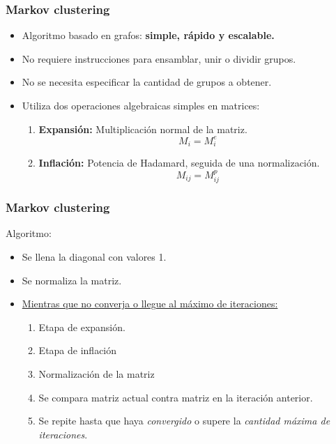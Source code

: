 \begin{frame}[t,fragile]
\frametitle {Markov clustering}
\begin{itemize}
\item Algoritmo basado en grafos: \textbf{simple, rápido y escalable.}
\vspace{2mm}
\item No requiere instrucciones para ensamblar, unir o dividir grupos.
\vspace{2mm}
\item No se necesita especificar la cantidad de grupos a obtener.
\vspace{2mm}
\item Utiliza dos operaciones algebraicas simples en matrices:
\vspace{2mm}
\begin{enumerate}
	\item \textbf{Expansión:} Multiplicación normal de la matriz. $$M_i = M_i ^ e$$
	\item \textbf{Inflación:} Potencia de Hadamard, seguida de una normalización. $$M_{ij} = M_{ij}^p$$
\end{enumerate}
\end{itemize}
\end{frame}
\begin{frame}[t,fragile]
\frametitle {Markov clustering}
Algoritmo: 
\begin{itemize}
\item Se llena la diagonal con valores 1.
\vspace{2mm}
\item Se normaliza la matriz.
\vspace{2mm}
\item \underline{Mientras que no converja o llegue al máximo de iteraciones:}
\vspace{2mm}
\begin{enumerate}
\item Etapa de expansión.
\vspace{2mm}
\item Etapa de inflación
\vspace{2mm}
\item Normalización de la matriz
\vspace{2mm}
\item Se compara matriz actual contra matriz en la iteración anterior.
\vspace{2mm}
\item Se repite hasta que haya \textit{convergido} o supere la \textit{cantidad máxima de iteraciones}.
\end{enumerate}
\end{itemize}
\end{frame}
